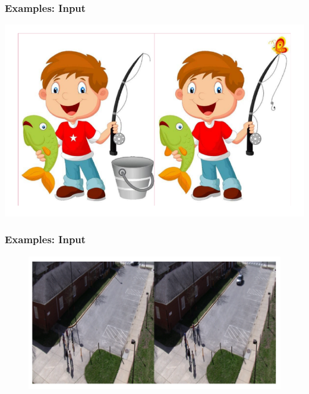 \documentclass[13.5pt,aspecratio=169, xcolor=dvipsnames]{beamer}
\begin{document}
    \begin{frame}
    \onehalfspacing
        \frametitle{Examples: Input}
        \hspace{1em}
        \includegraphics[scale=0.5]{Example/Fishing_boy.png}
    \end{frame}

    \begin{frame}
        \onehalfspacing
            \frametitle{Examples: Input}
            \begin{figure}[h]
            \centering
            \includegraphics[scale=0.5]{Example/Camera_1.png}
            \end{figure}
        \end{frame}
\end{document}
